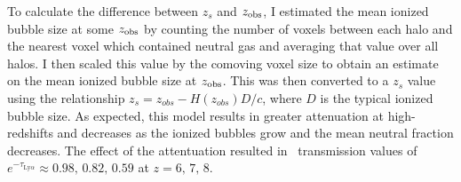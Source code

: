 To calculate the difference between $z_s$ and $z_{\rm obs}$, I estimated the mean ionized bubble
size at some $z_{\rm obs}$ by counting the number of voxels between each halo and the nearest
voxel which contained neutral gas and averaging that value over all halos. I then scaled this value
by the comoving voxel size to obtain an estimate on the mean ionized bubble size at $z_{\rm obs}$. This was then
converted to a $z_s$ value using the relationship $z_{s} = z_{obs} - H\left(z_{obs} \right) D / c$, where
$D$ is the typical ionized bubble size. As expected, this model results in greater attenuation
at high-redshifts and decreases as the ionized bubbles grow and the mean neutral fraction decreases.
The effect of the attentuation resulted in \lya\ transmission values of
$e^{-\tau_{\textrm{Ly}\alpha}} \approx 0.98,\, 0.82,\, 0.59$ at $z = 6, \, 7,\, 8$.
